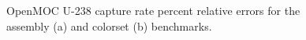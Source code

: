 \begin{figure}[h!]
\begin{subfigure}{0.45\textwidth}
  \caption{}
  \label{fig:colorset-capt-single-step-error}
\end{subfigure}
\caption{OpenMOC U-238 capture rate percent relative errors for the assembly (a) and colorset (b) benchmarks.}
\label{fig:capt-errors}
\end{figure}
